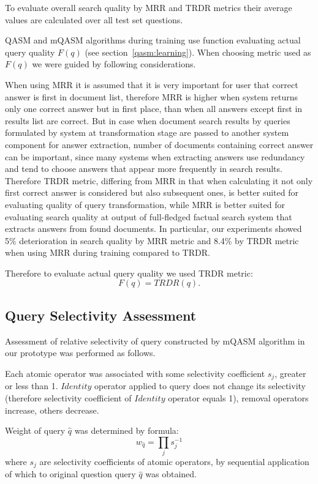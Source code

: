 \documentclass{article}
\begin{document}
To evaluate overall search quality by MRR and TRDR metrics
their average values are calculated over all test set questions.

QASM and mQASM algorithms during training use
function evaluating actual query quality $F(q)$ (see section~\ref{qasm:learning}).
When choosing metric used as $F(q)$ we were guided by
following considerations.

When using MRR
it is assumed that it is very important for user that correct answer
is first in document list, therefore
MRR is higher when system returns only one
correct answer but in first place,
than when all answers except first in results list are correct.
But in case when document search results by queries formulated
by system at transformation stage
are passed to another system component for answer extraction,
number of documents containing correct answer
can be important, since many systems
when extracting answers use redundancy and tend to choose
answers that appear more frequently in search results.
Therefore TRDR metric, differing from MRR in that when calculating it
not only first correct answer is considered but also subsequent ones,
is better suited for evaluating quality of query transformation,
while MRR is better suited for evaluating search quality at output
of full-fledged factual search system that extracts answers from
found documents.
In particular, our experiments showed 5\%
deterioration in search quality by
MRR metric and 8.4\% by TRDR metric when using MRR during training
compared to TRDR.

Therefore to evaluate actual query quality we used TRDR metric:
$$F(q) = TRDR(q).$$

\subsection{Query Selectivity Assessment} \label{selectivity}
Assessment of relative selectivity of query constructed by mQASM algorithm
in our prototype was performed as follows.

Each atomic operator was associated with some
selectivity coefficient $s_j$, greater or less than 1.
$Identity$ operator applied to query does not change
its selectivity (therefore selectivity coefficient of $Identity$ operator equals 1),
removal operators increase, others
decrease.

Weight of query $\hat{q}$ was determined by formula:
$$w_{\hat{q}}=\prod_j s_j^{-1}$$
where $s_j$ are selectivity coefficients of atomic operators,
by sequential application of which to original question query $\hat{q}$ was obtained.
\end{document}
